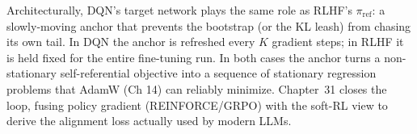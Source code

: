 Architecturally, DQN's target network plays the same role as RLHF's $\pi_{\mathrm{ref}}$: a slowly-moving anchor that prevents the bootstrap (or the KL leash) from chasing its own tail. In DQN the anchor is refreshed every $K$ gradient steps; in RLHF it is held fixed for the entire fine-tuning run. In both cases the anchor turns a non-stationary self-referential objective into a sequence of stationary regression problems that AdamW (Ch 14) can reliably minimize. Chapter~31 closes the loop, fusing policy gradient (REINFORCE/GRPO) with the soft-RL view to derive the alignment loss actually used by modern LLMs.
